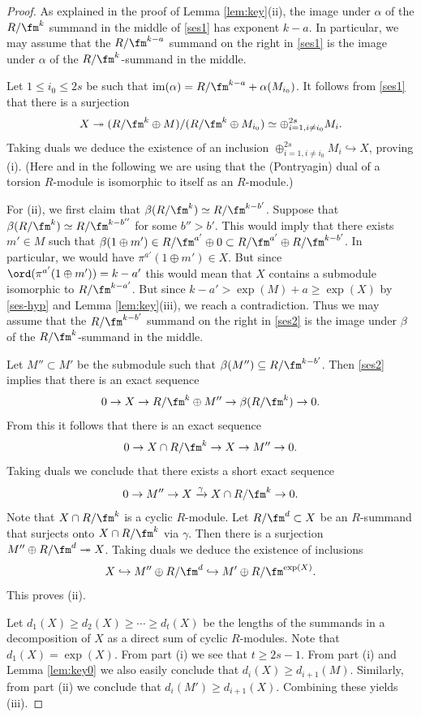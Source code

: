 \begin{proof}
As explained in the proof of Lemma \ref{lem:key}(ii),
 the image under $\alpha$ of the $R/\fm^k$ summand in the middle of \eqref{ses1} has exponent $k-a$.
In particular, we may assume that the $R/\fm^{k-a}$ summand on the right in \eqref{ses1}
is the image under $\alpha$ of the $R/\fm^k$-summand in the middle.

Let $1\leqslant i_0\leqslant 2s$ be such that $\mathrm{im}(\alpha) = R/\fm^{k-a}+\alpha(M_{i_0})$.
It follows from \eqref{ses1} that there is a surjection
$$
X\twoheadrightarrow (R/\fm^k\oplus M)/(R/\fm^k\oplus M_{i_0})\simeq \oplus_{i=1, i\neq i_0}^{2s} M_i.
$$
Taking duals we deduce the existence of an inclusion
$\oplus_{i=1, i\neq i_0}^{2s} M_i \hookrightarrow X$,
proving (i). (Here and in the following we are using that the (Pontryagin) dual of a torsion $R$-module is
isomorphic to itself as an $R$-module.)

For (ii), we first claim that $\beta(R/\fm^k) \simeq R/\fm^{k-b'}$. Suppose
that $\beta(R/\fm^k) \simeq R/\fm^{k-b''}$ for some $b''>b'$. This would imply that there exists $m'\in M$ such that
$\beta(1\oplus m' ) \in R/\fm^{a'}\oplus 0 \subset R/\fm^{a'}\oplus R/\fm^{k-b'}$. In particular, we would have
 $\pi^{a'}(1\oplus m') \in X$. But since $\ord(\pi^{a'}(1\oplus m')) = k-a'$ this would mean that $X$ contains
 a submodule isomorphic to $R/\fm^{k-a'}$.
 But since $k-a'> \exp(M)+a \geqslant \exp(X)$ by  \eqref{ses-hyp} and Lemma \ref{lem:key}(iii), we reach a contradiction.
Thus we may assume that
the $R/\fm^{k-b'}$ summand on the right in \eqref{ses2}
is the image under $\beta$ of the $R/\fm^k$-summand in the middle.

Let $M''\subset M'$ be the submodule such that $\beta(M'')\subseteq R/\fm^{k-b'}$.
Then \eqref{ses2} implies that there is an exact sequence
$$
0\rightarrow X \rightarrow R/\fm^k \oplus M'' \rightarrow \beta(R/\fm^k)\rightarrow 0.
$$
From this it follows that there is an exact sequence
$$
0\rightarrow X\cap R/\fm^k \rightarrow X \rightarrow M'' \rightarrow 0.
$$
Taking duals we conclude that there exists a short exact sequence
$$
0 \rightarrow M'' \rightarrow X \xrightarrow{\gamma} X\cap R/\fm^k \rightarrow 0.
$$
Note that $X\cap R/\fm^k$ is a cyclic $R$-module.
Let $R/\fm^{d} \subset X$ be an $R$-summand that surjects
onto $X\cap R/\fm^k$ via $\gamma$. Then there is a surjection
$M''\oplus R/\fm^{d}\twoheadrightarrow X$.
Taking duals we deduce the existence of inclusions
$$
X\hookrightarrow M'' \oplus R/\fm^d \hookrightarrow M'\oplus R/\fm^{\exp(X)}.
$$
This proves (ii).

Let
$d_1(X) \geqslant d_2(X) \geqslant \cdots \geqslant d_{t}(X)$
be the lengths of the summands in a decomposition of $X$ as a direct sum of cyclic $R$-modules.
Note that $d_1(X)=\exp(X)$. From part (i) we see that $t\geqslant 2s-1$.
From part (i) and Lemma \ref{lem:key0} we also easily conclude that $d_i(X) \geqslant d_{i+1}(M)$.
Similarly, from part (ii) we conclude that $d_i(M') \geqslant d_{i+1}(X)$. Combining these yields (iii).
\end{proof}


